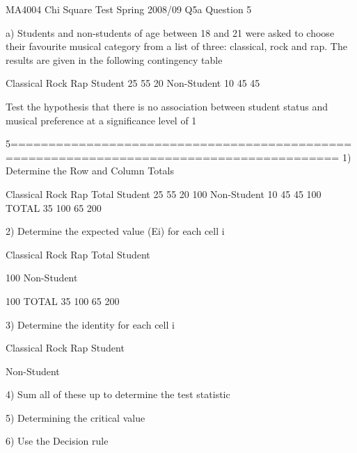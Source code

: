 MA4004               Chi Square Test              Spring 2008/09 Q5a
Question 5
 
a) Students and non-students of age between 18 and 21 were asked to choose their favourite musical category from a list of three: classical, rock and rap. The results are given in the following contingency table
 
 
Classical
Rock
Rap
Student
25
55
20
Non-Student
10
45
45
 
Test the hypothesis that there is no association between student status and musical preference at a significance level of 1%

5=========================================================================================%
1) Determine the Row and Column Totals
 
Classical
Rock
Rap
Total
Student
25
55
20
100
Non-Student
10
45
45
100
TOTAL
35
100
65
200
 
2) Determine the expected value (Ei)  for each cell i
 
Classical
Rock
Rap
Total
Student



100
Non-Student



100
TOTAL
35
100
65
200
 

 
3) Determine the identity  for each cell i
 
 
Classical
Rock
Rap
Student



Non-Student


 
4) Sum all of these up to determine the test statistic
 
5) Determining the critical value
 
6) Use the Decision rule
